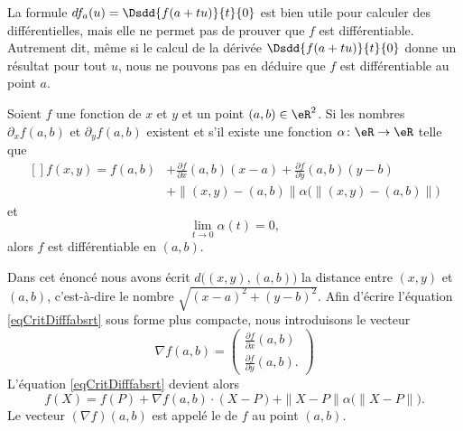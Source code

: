 La formule $df_a(u)=\Dsdd{ f(a+tu) }{t}{0}$ est bien utile pour calculer des différentielles, mais elle ne permet pas de prouver que \( f\) est différentiable. Autrement dit, même si le calcul de la dérivée \( \Dsdd{ f(a+tu) }{t}{0}\) donne un résultat pour tout \( u\), nous ne pouvons pas en déduire que \( f\) est différentiable au point \( a\).


\begin{proposition} \label{PropExistDiffUn}
    Soient $f$ une fonction de $x$ et $y$ et un point $(a,b)\in\eR^2$. Si les nombres $\partial_xf(a,b)$ et $\partial_yf(a,b)$ existent et s'il existe une fonction $\alpha\colon \eR\to \eR$ telle que
    \begin{equation}        \label{eqCritDifffabsrt}
        \begin{aligned}[]
            f(x,y)=f(a,b)&+\frac{ \partial f }{ \partial x }(a,b)(x-a)+\frac{ \partial f }{ \partial y }(a,b)(y-b)\\
            &+\| (x,y)-(a,b) \| \alpha\Big( \| (x,y)-(a,b) \| \Big)
        \end{aligned}
    \end{equation}
    et
    \begin{equation}
        \lim_{t\to 0} \alpha(t)=0,
    \end{equation}
    alors $f$ est différentiable en $(a,b)$.
\end{proposition}


\begin{normaltext}
    Dans cet énoncé nous avons écrit $d\big( (x,y),(a,b) \big)$ la distance entre $(x,y)$ et $(a,b)$, c'est-à-dire le nombre $\sqrt{(x-a)^2+(y-b)^2}$. Afin d'écrire l'équation \eqref{eqCritDifffabsrt} sous forme plus compacte, nous introduisons le vecteur
    \begin{equation}
        \nabla f(a,b)=\begin{pmatrix}
            \frac{ \partial f }{ \partial x }(a,b)    \\
            \frac{ \partial f }{ \partial y }(a,b).
        \end{pmatrix}
    \end{equation}
    L'équation \eqref{eqCritDifffabsrt} devient alors
    \begin{equation}        \label{EqdiffComp}
        f(X)=f(P)+\nabla f(a,b)\cdot (X-P)+\| X-P \|\alpha\big( \| X-P \| \big).
    \end{equation}
    Le vecteur $(\nabla f)(a,b)$ est appelé le  de $f$ au point $(a,b)$.
\end{normaltext}

